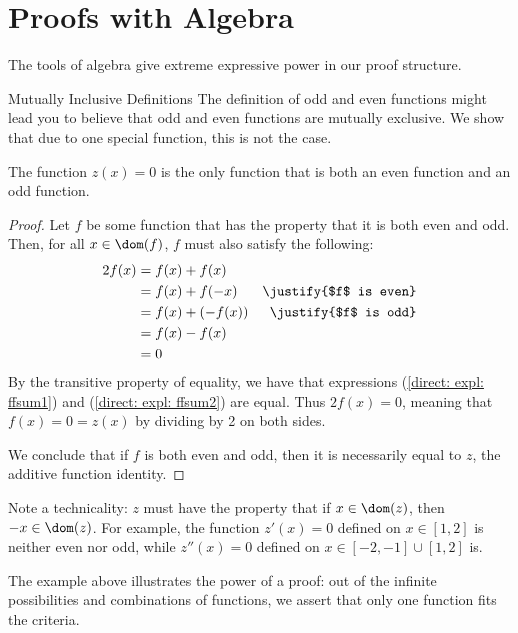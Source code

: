 \section{Proofs with Algebra}
The tools of algebra give extreme expressive power in our proof structure.

\begin{expl}{Mutually Inclusive Definitions}
The definition of odd and even functions might lead you to believe that odd and
even functions are mutually exclusive. We show that due to one special
function, this is not the case.

\begin{claim} The function $z(x) = 0$ is the only function that is both an even
  function and an odd function.
\end{claim}
\begin{proof}
  Let $f$ be some function that has the property that it is both even and odd.
  Then, for all $x \in \dom(f)$, $f$ must also satisfy the following:
  \begin{align}
    2f(x) \label{direct: expl: ffsum1}
      &= f(x) + f(x) \\
      &= f(x) + f(-x) & \justify{$f$ is even} \\
      &= f(x) + (-f(x)) & \justify{$f$ is odd} \\
      &= f(x) - f(x) \\
      &= 0 \label{direct: expl: ffsum2}
  \end{align}
  By the transitive property of equality, we have that expressions
  (\ref{direct: expl: ffsum1}) and (\ref{direct: expl: ffsum2}) are equal. Thus
  $2f(x) = 0$, meaning that $f(x) = 0 = z(x)$ by dividing by 2 on both sides.


  We conclude that if $f$ is both even and odd, then it is necessarily equal
  to $z$, the additive function identity.
\end{proof}

Note a technicality: $z$ must have the property that if $x \in \dom(z)$, then
$-x \in \dom(z)$. For example, the function $z'(x) = 0$ defined
on $x \in [1, 2]$ is neither even nor odd, while $z''(x) = 0$ defined on
$x \in [-2, -1] \cup [1, 2]$ is.
\end{expl}

The example above illustrates the power of a proof: out of the infinite
possibilities and combinations of functions, we assert that only one function
fits the criteria.

